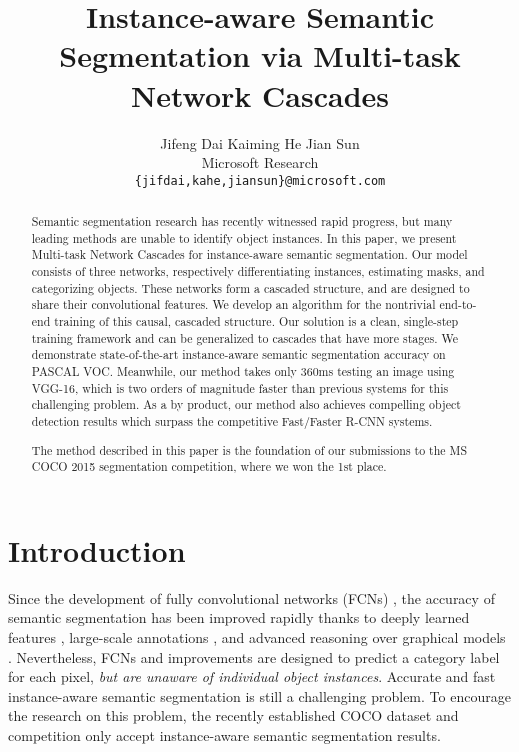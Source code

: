\documentclass[10pt,twocolumn,letterpaper]{article}
\begin{document}
\title{Instance-aware Semantic Segmentation via Multi-task Network Cascades}

\author{Jifeng Dai \qquad\qquad Kaiming He \qquad\qquad Jian Sun \vspace{8pt}\\
Microsoft Research\\
{\tt\small \{jifdai,kahe,jiansun\}@microsoft.com}
}


\maketitle

\begin{abstract}
\vspace{-1em}
Semantic segmentation research has recently witnessed rapid progress, but many leading methods are unable to identify object instances. In this paper, we present Multi-task Network Cascades for instance-aware semantic segmentation. Our model consists of three networks, respectively differentiating instances, estimating masks, and categorizing objects. These networks form a cascaded structure, and are designed to share their convolutional features. We develop an algorithm for the nontrivial end-to-end training of this causal, cascaded structure. Our solution is a clean, single-step training framework and can be generalized to cascades that have more stages.
We demonstrate state-of-the-art instance-aware semantic segmentation accuracy on PASCAL VOC. Meanwhile, our method takes only 360ms testing an image using VGG-16, which is two orders of magnitude faster than previous systems for this challenging problem. As a by product, our method also achieves compelling object detection results which surpass the competitive Fast/Faster R-CNN systems.

The method described in this paper is the foundation of our submissions to the MS COCO 2015 segmentation competition, where we won the 1st place.
\end{abstract}




\section{Introduction}

Since the development of fully convolutional networks (FCNs) \cite{Long2015}, the accuracy of semantic segmentation has been improved rapidly \cite{Chen2015,Papandreou2015,Dai2015a,Zheng2015} thanks to deeply learned features \cite{Krizhevsky2012,Simonyan2015}, large-scale annotations \cite{Lin2014}, and advanced reasoning over graphical models \cite{Chen2015,Zheng2015}. Nevertheless, FCNs \cite{Long2015} and improvements \cite{Chen2015,Papandreou2015,Dai2015a,Zheng2015} are designed to predict a category label for each pixel, \emph{but are unaware of individual object instances}.
Accurate and fast instance-aware semantic segmentation is still a challenging problem.
To encourage the research on this problem, the recently established COCO \cite{Lin2014} dataset and competition only accept instance-aware semantic segmentation results.
\end{document}
